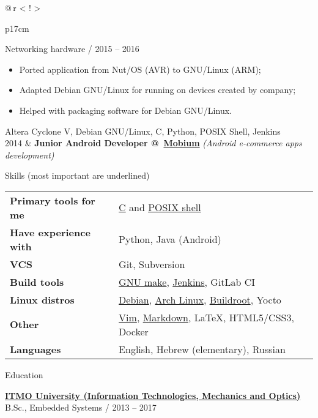 \documentclass[hidelinks]{resume} %
\newcommand{\timeline}{\color{LightSteelBlue3}\makebox[0pt]{\textbullet}\hskip-0.5pt\vrule width 1pt\hspace{\labelsep}}
\begin{document}
\begin{table}[!htbp]
\begin{tabularx}{\textwidth}{@{\,}r <{\hskip 2pt} !{\timeline} >{\raggedright\arraybackslash}p{17cm}}
{\small {Networking hardware}\vspace{2mm} / 2015 -- 2016}

\begin{itemize}[leftmargin=1em]
\item Ported application from Nut/OS (AVR) to GNU/Linux (ARM);
\item Adapted Debian GNU/Linux for running on devices created by company;
\item Helped with packaging software for Debian GNU/Linux.
\end{itemize}\vspace{2mm}
{\small {Altera Cyclone V, Debian GNU/Linux, C, Python, POSIX Shell, Jenkins}}
\vspace{5mm}\\

2014 &
\textbf{Junior Android Developer @\
    \href{http://mobiumapps.com/}{Mobium}} \textit{(Android e-commerce apps development)}\\
\end{tabularx}
\end{table}


\begin{rSection}{Skills (most important are underlined)}
{
\begin{tabular}{ @{} >{\bfseries}l @{\hspace{6ex}} l }
Primary tools for me & \underline{C} and \underline{POSIX shell} \\
Have experience with & Python, Java (Android) \\
VCS & Git, Subversion \\
Build tools & \underline{GNU make}, \underline{Jenkins}, GitLab CI\\
Linux distros & \underline{Debian}, \underline{Arch Linux}, \underline{Buildroot}, Yocto\\
Other & \underline{Vim}, \underline{Markdown}, \LaTeX, HTML5/CSS3, Docker\\
Languages&  English, Hebrew (elementary), Russian\\
\end{tabular}
}

\end{rSection}


\begin{rSection}{Education}

{\href{https://en.itmo.ru/}{\textbf{ITMO University (Information Technologies, Mechanics and Optics)}}} \hfill {} \\
B.Sc., Embedded Systems / 2013 -- 2017
\end{rSection}
\end{document}
